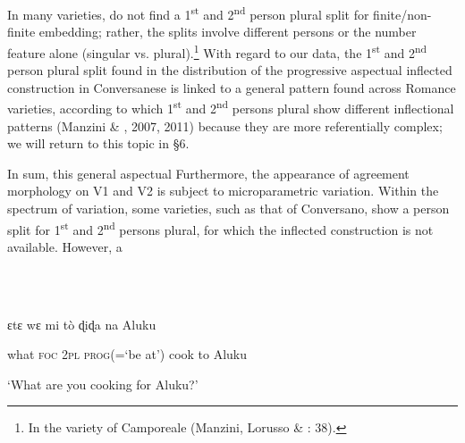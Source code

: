 \documentclass[output=paper]{langsci/langscibook}
\begin{document}
In many varieties, \citet{ManziniEtAl2017} do not find a 1\textsuperscript{st} and 2\textsuperscript{nd} person plural split for finite/non-finite embedding; rather, the splits involve different persons or the number feature alone (singular vs. plural).\footnote{In the variety of Camporeale (Manzini, Lorusso \& \citealt{Savoia2017}: 38).} With regard to our data, the 1\textsuperscript{st} and 2\textsuperscript{nd} person plural split found in the distribution of the progressive aspectual inflected construction in Conversanese is linked to a general pattern found across Romance varieties, according to which 1\textsuperscript{st} and 2\textsuperscript{nd} persons plural show different inflectional patterns (Manzini \& \citealt{Savoia2005}, 2007, 2011) because they are more referentially complex; we will return to this topic in §6. 

In sum, this general aspectual  Furthermore, the appearance of agreement morphology on V1 and V2 is subject to microparametric variation. Within the spectrum of variation, some varieties, such as that of Conversano, show a person split for 1\textsuperscript{st} and 2\textsuperscript{nd} persons plural, for which the inflected construction is not available. However, a

\ea%
    \label{ex:key:21}
    \gll\\
        \\
    \glt
    \z

          ɛtɛ   wɛ   mi   tò       ɖiɖa   na  Aluku 

   what  \textsc{foc} \textsc{2pl} \textsc{prog}(=‘be at’)   cook  to  Aluku 

  ‘What are you cooking for Aluku?’ \citep{Aboh2004} 
\end{document}
